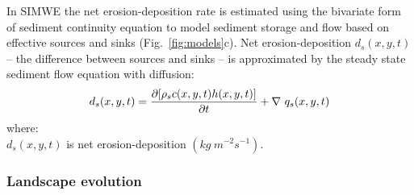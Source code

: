 \documentclass[esurf, manuscript]{copernicus}
\begin{document}
In SIMWE 
the net erosion-deposition rate is estimated
using the bivariate form of sediment continuity equation
to model sediment storage and flow 
based on effective sources and sinks
(Fig.~\ref{fig:models}c). %
Net erosion-deposition $d_s(x,y,t)$
-- the difference between sources and sinks --
is approximated by
the steady state sediment flow equation with diffusion:
\begin{equation}\label{eq:sediment} 
d_s(x,y,t) = 
{\partial [\rho_sc(x,y,t)h(x,y,t)] \over \partial t} +
\nabla ~ q_s(x,y,t)
\end{equation}
{\small
\noindent
where: \\
\hspace*{0.5em} $d_s(x,y,t)$ is net erosion-deposition $(kg ~ m^{-2} s^{-1})$.\\
}


%
%


\subsubsection{Landscape evolution}
\end{document}

